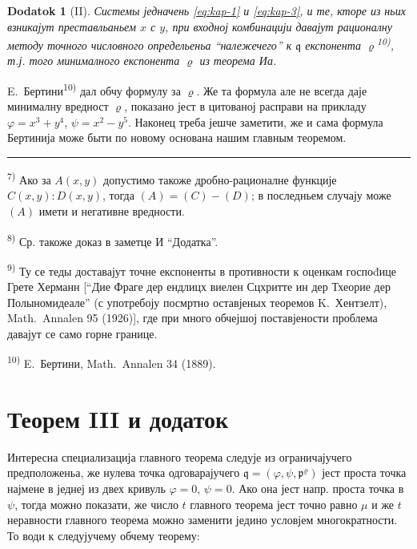 \documentclass[11pt]{article}
\newcommand{\foreign}[1]{#1}
\theoremstyle{plain}
\newtheorem{zusatz}{Dodatok}
\begin{document}
\begin{zusatz}[II]
Системы једначень \eqref{eq:kap-1} и \eqref{eq:kap-3}, и те, кторе
из ньих взникајут преставльаньем $x$ с $y$, при входној комбинацији
давајут рационалну методу точного числовного определьеньа
``належечего'' к $\mathfrak{q}$ експонента
$\varrho$\textsuperscript{10)}, т.ј. того минималного експонента
$\varrho$ из теорема Иа.
\end{zusatz}

E.\ Бертини\textsuperscript{10)} дал обчу формулу за $\varrho$.
Же та формула але не всегда даје минималну вредност $\varrho$,
показано јест в цитованој расправи на прикладу
$\varphi = x^{3} + y^{4}$, $\psi = x^{2} - y^{5}$. Наконец треба
јешче заметити, же и сама формула Бертинија може быти по новому
основана нашим главным теоремом.

\vspace{0.5em}
\noindent\rule{\textwidth}{0.4pt}
\vspace{0.3em}

{\footnotesize
\textsuperscript{7)} Ако за $A(x,y)$ допустимо такоже дробно-рационалне
функције $C(x,y):D(x,y)$, тогда $(A) = (C) - (D)$; в последньем
случају може $(A)$ имети и негативне вредности.

\textsuperscript{8)} Ср. такоже доказ в заметце И ``Додатка''.

\textsuperscript{9)} Ту се теды доставајут точне експоненты в противности к
оценкам госпоđице Грете Херманн [``Дие Фраге дер ендлицх виелен Сцхритте
ин дер Тхеорие дер Полыномидеале'' (с употребоју посмртно оставјеных
теоремов K.\ Хентзелт), \foreign{Math.\ Annalen} 95 (1926)], где при
много обчејшој поставјености проблема давајут се само горне границе.

\textsuperscript{10)} E.\ Бертини, \foreign{Math.\ Annalen} 34 (1889).
}

\newpage
\section*{Теорем III и додаток}

Интересна специализација главного теорема следује из ограничајучего
предположеньа, же нулева точка одговарајучего
$\mathfrak{q} = (\varphi, \psi, \mathfrak{p}^{\varrho})$ јест проста
точка најмене в једнеј из двех кривуль $\varphi = 0$, $\psi = 0$.
Ако она јест напр. проста точка в $\psi$, тогда можно показати, же
число $t$ главного теорема јест точно равно $\mu$ и же $t$
неравности главного теорема можно заменити једино условјем
многократности. То води к следујучему обчему теорему:
\end{document}
